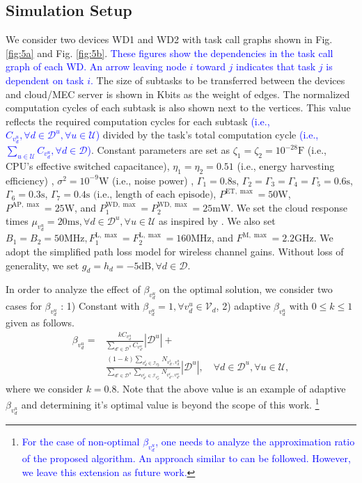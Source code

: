 \documentclass[12pt,draftclsnofoot,onecolumn]{IEEEtran}
\begin{document}
\subsection{Simulation Setup}
We consider two devices WD1 and WD2 with task call graphs shown in Fig. \ref{fig:5a} and Fig. \ref{fig:5b}. \textcolor{blue}{These figures show the dependencies in the task call graph of each WD. An arrow leaving node $i$ toward $j$ indicates that task $j$ is dependent on task $i$.} The size of subtasks to be transferred between the devices and cloud/MEC server is shown in Kbits as the weight of edges. The normalized computation cycles of each subtask is also shown next to the vertices. This value reflects the required computation cycles for each subtask \textcolor{blue}{(i.e., $C_{v_d^u}, \forall d\in\mathcal{D}^u, \forall u\in\mathcal{U}$)} divided by the task's total computation cycle \textcolor{blue}{(i.e., $\sum_{u\in\mathcal{U}}C_{v_d^u}, \forall d\in\mathcal{D}$)}. Constant parameters are set as $\zeta_1=\zeta_2=10^{-28} \text{F}$ (i.e., CPU's effective switched capacitance)\cite{b2}, $\eta_1=\eta_2=0.51$ (i.e., energy harvesting efficiency) \cite{b2}, $\sigma^2=10^{-9}\text{W}$ (i.e., noise power) \cite{b2}, $\Gamma_1=0.8\text{s}$, $\Gamma_2=\Gamma_3=\Gamma_4=\Gamma_5=0.6\text{s}$, $\Gamma_6=0.3\text{s}$, $\Gamma_7=0.4\text{s} \text{ (i.e., length of each episode)}$, $P^{\text{ET}, \max} = 50\text{W}$, $P^{\text{AP}, \max} = 25\text{W}$, and $P^{\text{WD}, \max}_1 = P^{\text{WD}, \max}_2 = 25\text{mW}$. We set the cloud response times $\mu_{v_d^u}=20\text{ms}, \forall d\in\mathcal{D}^u, \forall u\in\mathcal{U}$ as inspired by \cite{b24}. We also set $B_1 = B_2 = 50\text{MHz}, F_{1}^{\text{L},\max} = F_{2}^{\text{L},\max} = 160\text{MHz}$, and $F^{\text{M},\max} = 2.2\text{GHz}$. We adopt the simplified path loss model \cite{b21} for wireless channel gains. Without loss of generality, we set $g_d = h_d = -5\text{dB}, \forall d\in\mathcal{D}$.

In order to analyze the effect of $\beta_{v_d^u}$ on the optimal solution, we consider two cases for $\beta_{v_d^u}$ :
1) Constant with $\beta_{v_d^u}=1, \forall v_d^u\in \mathcal{V}_d$, 2) adaptive $\beta_{v_d^u}$ with $0\leq k \leq 1$ given as follows.
\begin{equation}\label{eq32}
	\begin{aligned}
		\beta_{v_d^u} = &\frac{kC_{v_d^u}}{\sum_{d'\in\mathcal{D}^u}C_{v_{d'}^u}}|\mathcal{D}^u| +\\
		&\frac{(1-k)\sum_{v_d^i\in\mathcal{I}_{v_{d'}^u}}N_{v_{d'}^i,v_d^u}}{\sum_{d'\in\mathcal{D}^u}\sum_{v_{d'}^i\in\mathcal{I}_{v_{d'}^u}}N_{v_{d'}^i,v_{d'}^u}}|\mathcal{D}^u|,\quad\forall d\in\mathcal{D}^u, \forall u\in\mathcal{U},
	\end{aligned}
\end{equation}
where we consider $k=0.8$. Note that the above value is an example of adaptive $\beta_{v_d^u}$ and determining it's optimal value is beyond the scope of this work. \footnote{\textcolor{blue}{For the case of non-optimal $\beta_{v_d^u}$, one needs to analyze the approximation ratio of the proposed algorithm. An approach similar to \cite{b2} can be followed. However, we leave this extension as future work.}}
\end{document}
